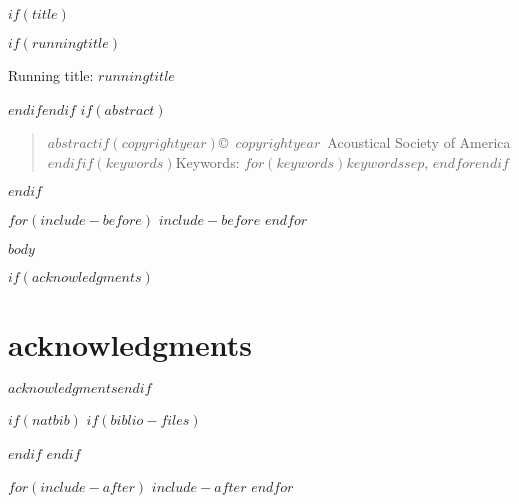 \documentclass[$if(fontsize)$$fontsize$,$endif$$if(lang)$$lang$,$endif$$if(papersize)$$papersize$,$endif$$for(classoption)$$classoption$$sep$,$endfor$]{$documentclass$}
\affil{$for(author)$$author.email$$sep$, $endfor$}
\begin{document}
\doublespacing

$if(title)$\maketitle$if(runningtitle)$\begin{center}Running title: $runningtitle$\end{center}$endif$$endif$
\cleardoublepage
\linenumbers
$if(abstract)$\begin{abstract}\noindent $abstract$$if(copyrightyear)$\newline\bigskip \copyright~$copyrightyear$~Acoustical Society of America$endif$$if(keywords)$\newline\bigskip\bigskip Keywords: $for(keywords)$$keywords$$sep$, $endfor$$endif$\end{abstract}\cleardoublepage$endif$

$for(include-before)$
$include-before$
$endfor$

$body$

$if(acknowledgments)$\section*{acknowledgments}$acknowledgments$\cleardoublepage$endif$

$if(natbib)$
$if(biblio-files)$

$endif$
$endif$

\cleardoublepage
\listoffigures

$for(include-after)$
$include-after$
$endfor$
\end{document}
